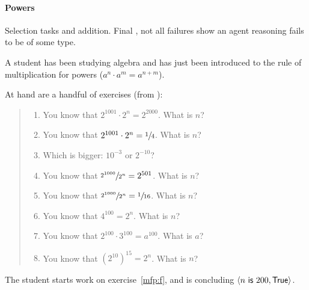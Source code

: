 \paragraph*{Powers}

\begin{note}
  Selection tasks and addition.
  Final , not all failures show an agent reasoning fails to be of some type.
\end{note}

\begin{note}
  \begin{scenario}%
    \label{illu:tR:powers}%
    A student has been studying algebra and has just been introduced to the rule of multiplication for powers (\(a^{n} \cdot a^{m} = a^{n + m}\)).

    At hand are a handful of exercises (from \cite[32]{Gelfand:1993aa}):
    \begin{quote}
      \begin{enumerate}[label=(\alph*), ref=(\alph*)]
      \item
        \label{mfp:a}
        You know that \(2^{1001} \cdot 2^{n} = 2^{2000}\).
        What is \(n\)?
      \item
        \label{mfp:b}
        You know that \(2^{1001} \cdot 2^{n} = \sfrac{1}{4}\).
        What is \(n\)?
      \item
        \label{mfp:c}
        Which is bigger: \(10^{-3}\) or \(2^{-10}\)?
      \item
        \label{mfp:d}
        You know that \(\sfrac{2^{1000}}{2^{n}} = 2^{501}\).
        What is \(n\)?
      \item
        \label{mfp:e}
        You know that \(\sfrac{2^{1000}}{2^{n}} = \sfrac{1}{16}\).
        What is \(n\)?
      \item
        \label{mfp:f}
        You know that \(4^{100} = 2^{n}\).
        What is \(n\)?
      \item
        \label{mfp:g}
        You know that \(2^{100} \cdot 3^{100} = a^{100}\).
        What is \(a\)?
      \item
        \label{mfp:h}
        You know that \((2^{10})^{15} = 2^{n}\).
        What is \(n\)?
      \end{enumerate}
    \end{quote}
    The student starts work on exercise~\ref{mfp:f}, and is concluding \(\pv{n\propI{ is }200}{\valI{True}}\).
  \end{scenario}


\end{note}

